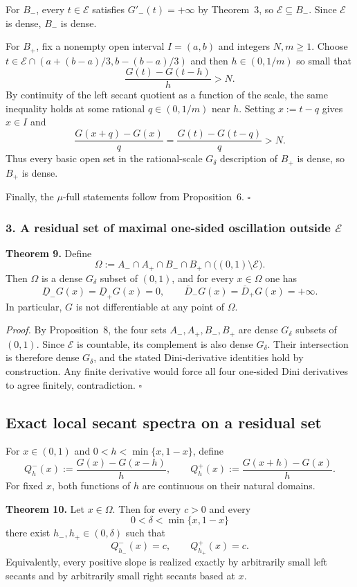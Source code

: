 For $B_-$, every $t\in\mathcal E$ satisfies $G'_-(t)=+\infty$ by Theorem~3, so $\mathcal E\subseteq B_-$. Since $\mathcal E$ is dense, $B_-$ is dense.

For $B_+$, fix a nonempty open interval $I=(a,b)$ and integers $N,m\ge1$. Choose $t\in\mathcal E\cap(a+(b-a)/3,b-(b-a)/3)$ and then $h\in(0,1/m)$ so small that
\[
\frac{G(t)-G(t-h)}{h}>N.
\]
By continuity of the left secant quotient as a function of the scale, the same inequality holds at some rational $q\in(0,1/m)$ near $h$. Setting $x:=t-q$ gives $x\in I$ and
\[
\frac{G(x+q)-G(x)}{q}=\frac{G(t)-G(t-q)}{q}>N.
\]
Thus every basic open set in the rational-scale $G_\delta$ description of $B_+$ is dense, so $B_+$ is dense.

Finally, the $\mu$-full statements follow from Proposition~6. \hfill$\square$

\subsubsection*{3. A residual set of maximal one-sided oscillation outside $\mathcal E$}

\noindent\textbf{Theorem 9.}
Define
\[
\Omega:=A_-\cap A_+\cap B_-\cap B_+\cap\bigl((0,1)\setminus\mathcal E\bigr).
\]
Then $\Omega$ is a dense $G_\delta$ subset of $(0,1)$, and for every $x\in\Omega$ one has
\[
\underline D_-G(x)=\underline D_+G(x)=0,
\qquad
\overline D_-G(x)=\overline D_+G(x)=+\infty.
\]
In particular, $G$ is not differentiable at any point of $\Omega$.

\medskip
\noindent\textit{Proof.}
By Proposition~8, the four sets $A_-,A_+,B_-,B_+$ are dense $G_\delta$ subsets of $(0,1)$. Since $\mathcal E$ is countable, its complement is also dense $G_\delta$. Their intersection is therefore dense $G_\delta$, and the stated Dini-derivative identities hold by construction. Any finite derivative would force all four one-sided Dini derivatives to agree finitely, contradiction. \hfill$\square$

\subsection{Exact local secant spectra on a residual set}

For $x\in(0,1)$ and $0<h<\min\{x,1-x\}$, define
\[
Q_h^-(x):=\frac{G(x)-G(x-h)}{h},
\qquad
Q_h^+(x):=\frac{G(x+h)-G(x)}{h}.
\]
For fixed $x$, both functions of $h$ are continuous on their natural domains.

\noindent\textbf{Theorem 10.}
Let $x\in\Omega$. Then for every $c>0$ and every
\[
0<\delta<\min\{x,1-x\}
\]
there exist $h_-,h_+\in(0,\delta)$ such that
\[
Q_{h_-}^-(x)=c,
\qquad
Q_{h_+}^+(x)=c.
\]
Equivalently, every positive slope is realized exactly by arbitrarily small left secants and by arbitrarily small right secants based at $x$.

